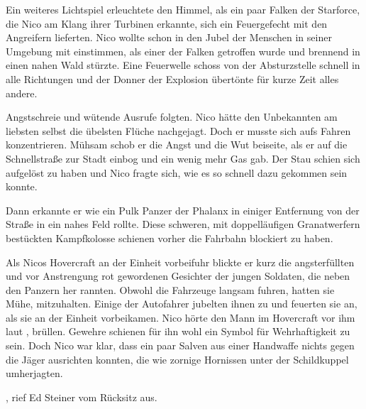 \par

Ein weiteres Lichtspiel erleuchtete den Himmel, als ein paar Falken der Starforce, die Nico am Klang ihrer Turbinen erkannte, sich ein Feuergefecht mit den Angreifern lieferten. Nico wollte schon in den Jubel der Menschen in seiner Umgebung mit einstimmen, als einer der Falken getroffen wurde und brennend in einen nahen Wald stürzte. Eine Feuerwelle schoss von der Absturzstelle schnell in alle Richtungen und der Donner der Explosion übertönte für kurze Zeit alles andere.

\par

Angstschreie und wütende Ausrufe folgten. Nico hätte den Unbekannten am liebsten selbst die übelsten Flüche nachgejagt. Doch er musste sich aufs Fahren konzentrieren. Mühsam schob er die Angst und die Wut beiseite, als er auf die Schnellstraße zur Stadt einbog und ein wenig mehr Gas gab. Der Stau schien sich aufgelöst zu haben und Nico fragte sich, wie es so schnell dazu gekommen sein konnte.

\par

Dann erkannte er wie ein Pulk Panzer der Phalanx in einiger Entfernung von der Straße in ein nahes Feld rollte. Diese schweren, mit doppelläufigen Granatwerfern bestückten Kampfkolosse schienen vorher die Fahrbahn blockiert zu haben.

\par

Als Nicos Hovercraft an der Einheit vorbeifuhr blickte er kurz die angsterfüllten und vor Anstrengung rot gewordenen Gesichter der jungen Soldaten, die neben den Panzern her rannten. Obwohl die Fahrzeuge langsam fuhren, hatten sie Mühe, mitzuhalten. Einige der Autofahrer jubelten ihnen zu und feuerten sie an, als sie an der Einheit vorbeikamen. Nico hörte den Mann im Hovercraft vor ihm laut , brüllen. Gewehre schienen für ihn wohl ein Symbol für Wehrhaftigkeit zu sein. Doch Nico war klar, dass ein paar Salven aus einer Handwaffe nichts gegen die Jäger ausrichten konnten, die wie zornige Hornissen unter der Schildkuppel umherjagten.

\par

, rief Ed Steiner vom Rücksitz aus. 

